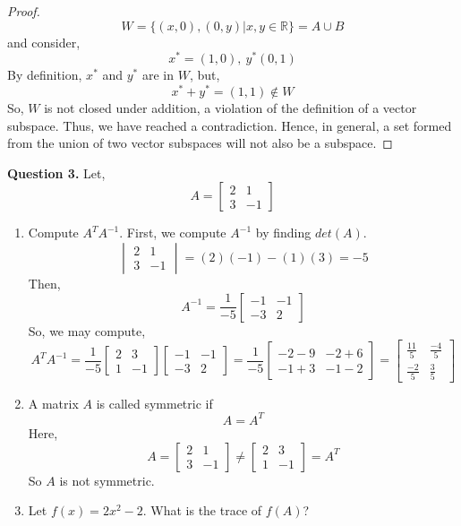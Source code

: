 \documentclass[letterpaper,10pt]{article}
\newcommand{\R}{\mathbb{R}}
\begin{document}
\begin{description}
\begin{enumerate}[label=\alph*.]
\begin{proof}
\[W=\{(x,0),(0,y)|x,y\in \R\}=A\cup B\]
and consider,
\[x^*=(1,0),\ y^*(0,1)\]
By definition, $x^*$ and $y^*$ are in $W$, but,
\[x^*+y^*=(1,1)\not\in W\]
So, $W$ is not closed under addition, a violation of the definition of a vector subspace. Thus, we have reached a contradiction. Hence, in general, a set formed from the union of two vector subspaces will not also be a subspace.
\end{proof}
\end{enumerate}
\item \textbf{Question 3.} Let,
\[A=\begin{bmatrix}
2 & 1 \\
3 & -1
\end{bmatrix}\]
\begin{enumerate}[label=\alph*.]
\item Compute $A^TA^{-1}$. First, we compute $A^{-1}$ by finding $det(A)$.\[\begin{vmatrix}
2 & 1 \\
3 & -1
\end{vmatrix}=(2)(-1)-(1)(3)=-5\]
Then,
\[A^{-1}=\frac{1}{-5}\begin{bmatrix}
-1 & -1 \\
-3 & 2
\end{bmatrix}\]
So, we may compute,
\[A^TA^{-1}=\frac{1}{-5}\begin{bmatrix}
2 & 3\\
1 & -1
\end{bmatrix}\begin{bmatrix}
-1 & -1\\
-3 & 2
\end{bmatrix}=\frac{1}{-5}\begin{bmatrix}
-2-9 & -2+6 \\
-1+3 & -1-2
\end{bmatrix}=\begin{bmatrix}
\frac{11}{5} & \frac{-4}{5}\\
\frac{-2}{5} & \frac{3}{5}
\end{bmatrix}\]
\item A matrix $A$ is called symmetric if
\[A=A^T\]
Here,
\[A=\begin{bmatrix}
2 & 1 \\
3 & -1
\end{bmatrix}\neq \begin{bmatrix}
2 & 3 \\
1 & -1
\end{bmatrix}=A^T\]
So $A$ is not symmetric.
\item Let $f(x)=2x^2-2$. What is the trace of $f(A)$?\\

\end{enumerate}
\end{description}
\end{document}
